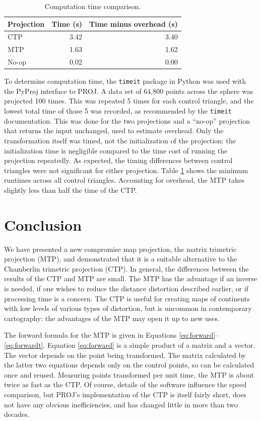 \documentclass[]{interact}
\begin{document}
\begin{table}
\begin{tabular}{ l r r}
  Projection & Time (s) & Time minus overhead (s)\\
\hline
  CTP & 3.42 & 3.40 \\
  MTP & 1.63 & 1.62 \\
  No-op & 0.02 & 0.00
\end{tabular}
\caption{Computation time comparison.}
\label{table:time}
\end{table}

To determine computation time, the \texttt{timeit} package in Python
\citep{python} was used with the PyProj interface to PROJ. \citep{pyproj} A
data set of 64,800 points across the sphere was projected 100 times. This was
repeated 5 times for each control triangle, and the lowest total time of those 5
was recorded, as recommended by the \texttt{timeit} documentation. This was
done for the two projections and a ``no-op'' projection that returns the input
unchanged, used to estimate overhead. Only the transformation itself was timed,
not the initialization of the projection: the initialization time is negligible
compared to the time cost of running the projection repeatedly. As expected,
the timing differences between control triangles were not significant for either
projection. Table \ref{table:time} shows the minimum
runtimes across all control triangles. Accounting for overhead,
the MTP takes slightly less than half the time of the CTP.

\section{Conclusion}
We have presented a new compromise map projection, the matrix trimetric
projection (MTP), and demonstrated that it is a suitable alternative to the
Chamberlin trimetric projection (CTP). In general, the differences between the
results of the CTP and MTP are small. The MTP has the advantage if an inverse
is needed, if one wishes to reduce the distance distortion described earlier,
or if processing time is a concern. The CTP is useful for creating maps of
continents with low levels of various types of distortion,
but is uncommon in contemporary cartography:
the advantages of the MTP may open it up to new uses.

The forward formula for the MTP is given in Equations
\ref{eq:forward}--\ref{eq:forwardt}. Equation \ref{eq:forward} is a simple
product of a matrix and a vector. The vector depends on the point being
transformed. The matrix calculated by the latter two equations depends only on
the control points, so can be calculated once and reused. Measuring points
transformed per unit time, the MTP is about twice as fast as the CTP. Of
course, details of the software influence the speed comparison, but
PROJ's implementation of the CTP is itself fairly short, does not have any
obvious inefficiencies, and has changed little in more than two decades.
\end{document}
